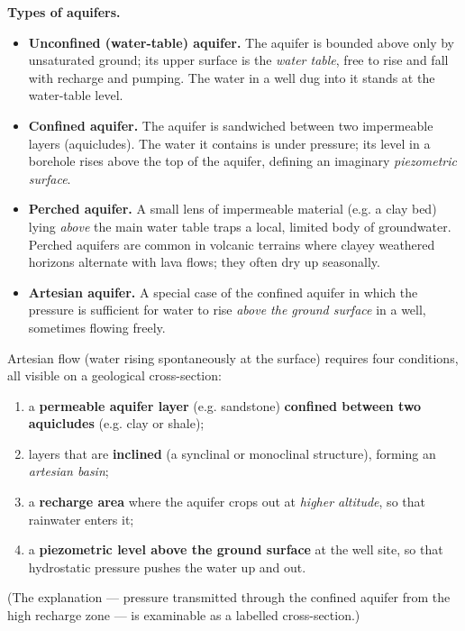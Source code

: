 \documentclass[11pt]{article}
\begin{document}
\textbf{Types of aquifers.}\par
\begin{itemize}
\item \textbf{Unconfined (water-table) aquifer.} The aquifer is bounded above only by unsaturated ground; its upper surface is the \emph{water table}, free to rise and fall with recharge and pumping. The water in a well dug into it stands at the water-table level.
\item \textbf{Confined aquifer.} The aquifer is sandwiched between two impermeable layers (aquicludes). The water it contains is under pressure; its level in a borehole rises above the top of the aquifer, defining an imaginary \emph{piezometric surface}.
\item \textbf{Perched aquifer.} A small lens of impermeable material (e.g. a clay bed) lying \emph{above} the main water table traps a local, limited body of groundwater. Perched aquifers are common in volcanic terrains where clayey weathered horizons alternate with lava flows; they often dry up seasonally.
\item \textbf{Artesian aquifer.} A special case of the confined aquifer in which the pressure is sufficient for water to rise \emph{above the ground surface} in a well, sometimes flowing freely.
\end{itemize}

\begin{propriete}
Artesian flow (water rising spontaneously at the surface) requires four conditions, all visible on a geological cross-section:
\begin{enumerate}
\item a \textbf{permeable aquifer layer} (e.g. sandstone) \textbf{confined between two aquicludes} (e.g. clay or shale);
\item layers that are \textbf{inclined} (a synclinal or monoclinal structure), forming an \emph{artesian basin};
\item a \textbf{recharge area} where the aquifer crops out at \emph{higher altitude}, so that rainwater enters it;
\item a \textbf{piezometric level above the ground surface} at the well site, so that hydrostatic pressure pushes the water up and out.
\end{enumerate}
(The explanation — pressure transmitted through the confined aquifer from the high recharge zone — is examinable as a labelled cross-section.)
\end{propriete}
\end{document}
